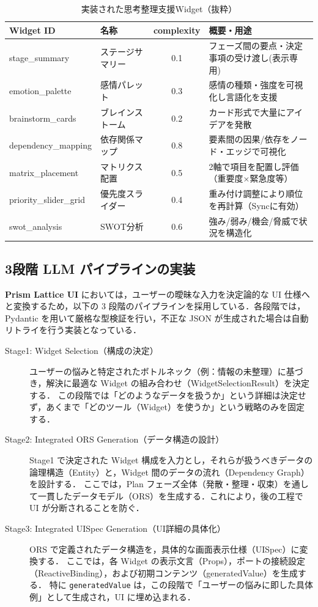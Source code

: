 \documentclass[a4paper,10pt]{jarticle}
\begin{document}
\begin{table}[!t]
\caption{実装された思考整理支援Widget（抜粋）}
\label{tab:widget_list}
\centering
\small
\begin{tabular}{llcp{5cm}} \toprule
Widget ID & 名称 & complexity & 概要・用途 \\ \midrule
stage\_summary & ステージサマリー & 0.1 & フェーズ間の要点・決定事項の受け渡し(表示専用) \\
emotion\_palette & 感情パレット & 0.3 & 感情の種類・強度を可視化し言語化を支援 \\
brainstorm\_cards & ブレインストーム & 0.2 & カード形式で大量にアイデアを発散 \\
dependency\_mapping & 依存関係マップ & 0.8 & 要素間の因果/依存をノード・エッジで可視化 \\
matrix\_placement & マトリクス配置 & 0.5 & 2軸で項目を配置し評価（重要度×緊急度等） \\
priority\_slider\_grid & 優先度スライダー & 0.4 & 重み付け調整により順位を再計算（Syncに有効） \\
swot\_analysis & SWOT分析 & 0.6 & 強み/弱み/機会/脅威で状況を構造化 \\ \bottomrule
\end{tabular}
\end{table}


\subsection{3段階 LLM パイプラインの実装}

\textbf{Prism Lattice UI} においては，ユーザーの曖昧な入力を決定論的な UI 仕様へと変換するため，以下の 3 段階のパイプラインを採用している．各段階では，Pydantic を用いて厳格な型検証を行い，不正な JSON が生成された場合は自動リトライを行う実装となっている．

\begin{description}
  \item[Stage1: Widget Selection（構成の決定）]
    ユーザーの悩みと特定されたボトルネック（例：情報の未整理）に基づき，解決に最適な Widget の組み合わせ（WidgetSelectionResult）を決定する．
    この段階では「どのようなデータを扱うか」という詳細は決定せず，あくまで「どのツール（Widget）を使うか」という戦略のみを固定する．
  \item[Stage2: Integrated ORS Generation（データ構造の設計）]
    Stage1 で決定された Widget 構成を入力とし，それらが扱うべきデータの論理構造（Entity）と，Widget 間のデータの流れ（Dependency Graph）を設計する．
    ここでは，Plan フェーズ全体（発散・整理・収束）を通して一貫したデータモデル（ORS）を生成する．これにより，後の工程で UI が分断されることを防ぐ．
  \item[Stage3: Integrated UISpec Generation（UI詳細の具体化）]
    ORS で定義されたデータ構造を，具体的な画面表示仕様（UISpec）に変換する．
    ここでは，各 Widget の表示文言（Props），ポートの接続設定（ReactiveBinding），および初期コンテンツ（generatedValue）を生成する．
    特に \texttt{generatedValue} は，この段階で「ユーザーの悩みに即した具体例」として生成され，UI に埋め込まれる．
\end{description}
\end{document}
